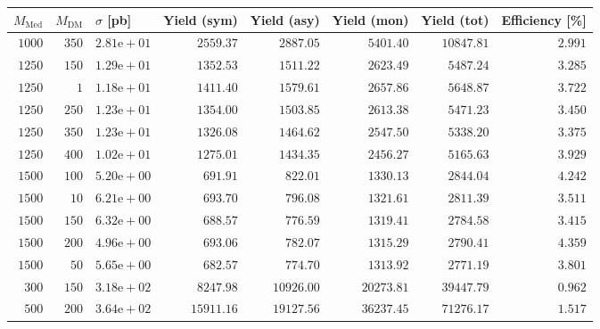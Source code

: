 \clearpage

\begin{table}
    \centering
    {\small
    \begin{tabular}{rrlrrrrr}
    \hline\hline
    $M_{\text{Med}}$ & $M_{\text{DM}}$ & $\sigma$ [pb] & Yield (sym) & Yield (asy) & Yield (mon) & Yield (tot) & Efficiency [\%] \\
    \hline
    $1000$ & $350$ & $2.81\text{e}+01$ & $2559.37$ & $2887.05$ & $5401.40$ & $10847.81$ & $2.991$ \\
    $1250$ & $150$ & $1.29\text{e}+01$ & $1352.53$ & $1511.22$ & $2623.49$ & $5487.24$ & $3.285$ \\
    $1250$ & $1$ & $1.18\text{e}+01$ & $1411.40$ & $1579.61$ & $2657.86$ & $5648.87$ & $3.722$ \\
    $1250$ & $250$ & $1.23\text{e}+01$ & $1354.00$ & $1503.85$ & $2613.38$ & $5471.23$ & $3.450$ \\
    $1250$ & $350$ & $1.23\text{e}+01$ & $1326.08$ & $1464.62$ & $2547.50$ & $5338.20$ & $3.375$ \\
    $1250$ & $400$ & $1.02\text{e}+01$ & $1275.01$ & $1434.35$ & $2456.27$ & $5165.63$ & $3.929$ \\
    $1500$ & $100$ & $5.20\text{e}+00$ & $691.91$ & $822.01$ & $1330.13$ & $2844.04$ & $4.242$ \\
    $1500$ & $10$ & $6.21\text{e}+00$ & $693.70$ & $796.08$ & $1321.61$ & $2811.39$ & $3.511$ \\
    $1500$ & $150$ & $6.32\text{e}+00$ & $688.57$ & $776.59$ & $1319.41$ & $2784.58$ & $3.415$ \\
    $1500$ & $200$ & $4.96\text{e}+00$ & $693.06$ & $782.07$ & $1315.29$ & $2790.41$ & $4.359$ \\
    $1500$ & $50$ & $5.65\text{e}+00$ & $682.57$ & $774.70$ & $1313.92$ & $2771.19$ & $3.801$ \\
    $300$ & $150$ & $3.18\text{e}+02$ & $8247.98$ & $10926.00$ & $20273.81$ & $39447.79$ & $0.962$ \\
    $500$ & $200$ & $3.64\text{e}+02$ & $15911.16$ & $19127.56$ & $36237.45$ & $71276.17$ & $1.517$ \\


\end{tabular}}
\end{table}
